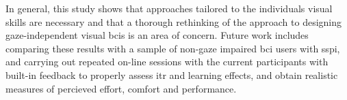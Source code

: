 In general, this study shows that approaches tailored to the individuals visual
skills are necessary and that a thorough rethinking of the approach to
designing gaze-independent visual \acp{bci} is an area of concern.
Future work includes comparing these results with a sample of non-gaze impaired
\ac{bci} users with \ac{sspi},
and carrying out repeated on-line sessions with the current participants with built-in feedback to
properly assess \ac{itr} and learning effects, and obtain realistic measures of percieved effort,
comfort and performance.



